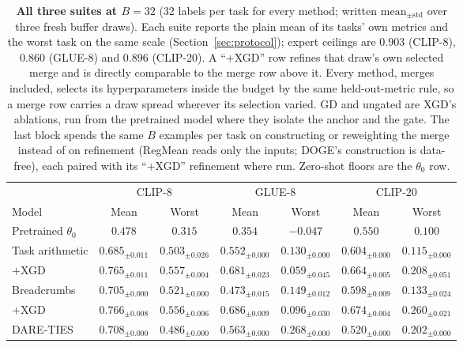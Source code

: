 \documentclass{article} %
\newcommand{\thetab}{\theta_0}
\begin{document}
\begin{table}[t]
\centering
\footnotesize
\setlength{\tabcolsep}{2.4pt}
\caption{\textbf{All three suites at $B{=}32$} (32 labels per task for every method; written $\mathrm{mean}_{\pm\mathrm{std}}$ over three fresh buffer draws). Each suite reports the plain mean of its tasks' own metrics and the worst task on the same scale (Section~\ref{sec:protocol}); expert ceilings are $0.903$ (CLIP-8), $0.860$ (GLUE-8) and $0.896$ (CLIP-20). A ``$+$XGD'' row refines that draw's own selected merge and is directly comparable to the merge row above it. Every method, merges included, selects its hyperparameters inside the budget by the same held-out-metric rule, so a merge row carries a draw spread wherever its selection varied. GD and ungated are XGD's ablations, run from the pretrained model where they isolate the anchor and the gate. The last block spends the same $B$ examples per task on constructing or reweighting the merge instead of on refinement (RegMean reads only the inputs; DOGE's construction is data-free), each paired with its ``$+$XGD'' refinement where run. Zero-shot floors are the $\thetab$ row.}
\label{tab:b32}
\begin{tabular}{lcccccc}
\toprule
 & \multicolumn{2}{c}{CLIP-8} & \multicolumn{2}{c}{GLUE-8} & \multicolumn{2}{c}{CLIP-20} \\
\cmidrule(lr){2-3}\cmidrule(lr){4-5}\cmidrule(lr){6-7}
Model & Mean & Worst & Mean & Worst & Mean & Worst \\
\midrule
Pretrained $\thetab$     & $0.478$ & $0.315$ & $0.354$ & $-0.047$ & $0.550$ & $0.100$ \\
\midrule
Task arithmetic          & $0.685_{\pm0.011}$ & $0.503_{\pm0.026}$ & $0.552_{\pm0.000}$ & $0.130_{\pm0.000}$ & $0.604_{\pm0.000}$ & $0.115_{\pm0.000}$ \\
\quad $+$XGD             & $0.765_{\pm0.011}$ & $0.557_{\pm0.004}$ & $0.681_{\pm0.023}$ & $0.059_{\pm0.045}$ & $0.664_{\pm0.005}$ & $0.208_{\pm0.051}$ \\
Breadcrumbs              & $0.705_{\pm0.000}$ & $0.521_{\pm0.000}$ & $0.473_{\pm0.015}$ & $0.149_{\pm0.012}$ & $0.598_{\pm0.009}$ & $0.133_{\pm0.024}$ \\
\quad $+$XGD             & $0.766_{\pm0.008}$ & $0.556_{\pm0.006}$ & $0.686_{\pm0.009}$ & $0.096_{\pm0.030}$ & $0.674_{\pm0.004}$ & $0.260_{\pm0.021}$ \\
DARE-TIES                & $0.708_{\pm0.000}$ & $0.486_{\pm0.000}$ & $0.563_{\pm0.000}$ & $0.268_{\pm0.000}$ & $0.520_{\pm0.000}$ & $0.202_{\pm0.000}$ \\

\end{tabular}
\end{table}
\end{document}
